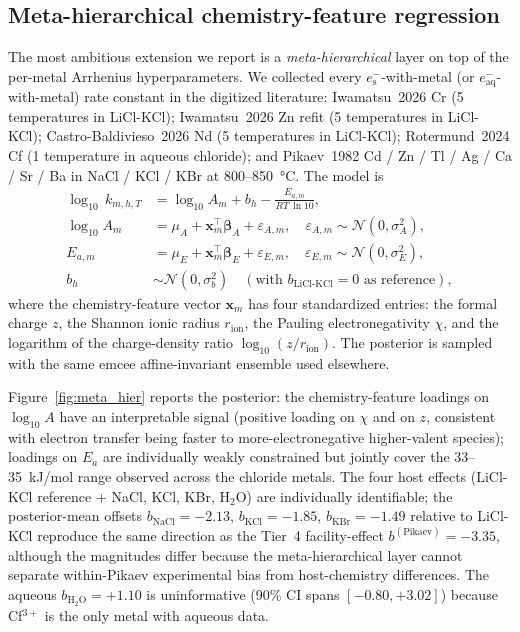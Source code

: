 \documentclass[12pt]{article}
\theoremstyle{plain}
\theoremstyle{definition}
\theoremstyle{remark}
\newcommand{\eS}{\ensuremath{e_{\mathrm{s}}^{-}}\xspace}
\begin{document}
\subsection{Meta-hierarchical chemistry-feature regression}\label{sec:pred:meta_hier}

The most ambitious extension we report is a \emph{meta-hierarchical} layer
on top of the per-metal Arrhenius hyperparameters.  We collected every
$\eS$-with-metal (or $e_{\mathrm{aq}}^-$-with-metal) rate constant in the
digitized literature:  Iwamatsu~2026 Cr (5 temperatures in LiCl-KCl);
Iwamatsu~2026 Zn refit (5 temperatures in LiCl-KCl);
Castro-Baldivieso~2026 Nd (5 temperatures in LiCl-KCl);
Rotermund~2024 Cf (1 temperature in aqueous chloride);
and Pikaev~1982 Cd / Zn / Tl / Ag / Ca / Sr / Ba in NaCl / KCl / KBr at
800--850~\si{\celsius}.  The model is
%
\begin{align}
  \log_{10}\,k_{m,h,T}
  &= \log_{10} A_m + b_h - \frac{E_{a,m}}{RT\,\ln 10}, \\
  \log_{10} A_m
  &= \mu_A + \mathbf{x}_m^\top\boldsymbol\beta_A + \varepsilon_{A,m},
  \quad \varepsilon_{A,m}\sim\mathcal{N}(0,\sigma_A^2), \\
  E_{a,m}
  &= \mu_E + \mathbf{x}_m^\top\boldsymbol\beta_E + \varepsilon_{E,m},
  \quad \varepsilon_{E,m}\sim\mathcal{N}(0,\sigma_E^2), \\
  b_h
  &\sim \mathcal{N}(0,\sigma_b^2)
  \quad (\text{with } b_{\mathrm{LiCl\text{-}KCl}} = 0\text{ as reference}),
\end{align}
%
where the chemistry-feature vector $\mathbf{x}_m$ has four standardized
entries:  the formal charge $z$, the Shannon ionic radius $r_\text{ion}$, the
Pauling electronegativity $\chi$, and the logarithm of the charge-density
ratio $\log_{10}(z/r_\text{ion})$.  The posterior is sampled with the same
emcee affine-invariant ensemble used elsewhere.

Figure~\ref{fig:meta_hier} reports the posterior:  the
chemistry-feature loadings on $\log_{10} A$ have an interpretable signal
(positive loading on $\chi$ and on $z$, consistent with electron transfer
being faster to more-electronegative higher-valent species);  loadings on
$E_a$ are individually weakly constrained but jointly cover the
33--35~kJ/mol range observed across the chloride metals.  The four host
effects (LiCl-KCl reference + NaCl, KCl, KBr, H$_2$O) are individually
identifiable;  the posterior-mean offsets $b_{\mathrm{NaCl}} = -2.13$, $b_{\mathrm{KCl}} =
-1.85$, $b_{\mathrm{KBr}} = -1.49$ relative to LiCl-KCl reproduce the same
direction as the Tier~4 facility-effect $b^{(\mathrm{Pikaev})} = -3.35$,
although the magnitudes differ because the meta-hierarchical layer cannot
separate within-Pikaev experimental bias from host-chemistry differences.
The aqueous $b_{\mathrm{H_2O}} = +1.10$ is uninformative (90\% CI spans
$[-0.80, +3.02]$) because Cf$^{3+}$ is the only metal with aqueous data.
\end{document}
